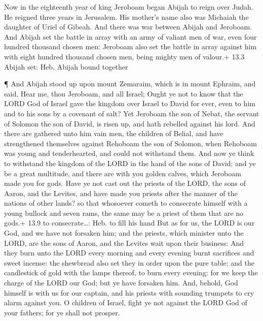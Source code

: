  Now in the eighteenth year of king Jeroboam began Abijah to
reign over Judah.  He reigned three years in Jerusalem. His
mother's name also was Michaiah the daughter of Uriel of Gibeah. And
there was war between Abijah and Jeroboam.  And Abijah set
the battle in array with an army of valiant men of war, even four
hundred thousand chosen men: Jeroboam also set the battle in array
against him with eight hundred thousand chosen men, being mighty men of
valour.+ 13.3 Abijah set: Heb. Abijah bound together

 ¶ And Abijah stood up upon mount Zemaraim, which is in
mount Ephraim, and said, Hear me, thou Jeroboam, and all Israel;
 Ought ye not to know that the LORD God of Israel gave the
kingdom over Israel to David for ever, even to him and to his sons by a
covenant of salt?  Yet Jeroboam the son of Nebat, the
servant of Solomon the son of David, is risen up, and hath rebelled
against his lord.  And there are gathered unto him vain men,
the children of Belial, and have strengthened themselves against
Rehoboam the son of Solomon, when Rehoboam was young and tenderhearted,
and could not withstand them.  And now ye think to withstand
the kingdom of the LORD in the hand of the sons of David; and ye be a
great multitude, and there are with you golden calves, which Jeroboam
made you for gods.  Have ye not cast out the priests of the
LORD, the sons of Aaron, and the Levites, and have made you priests
after the manner of the nations of other lands? so that whosoever cometh
to consecrate himself with a young bullock and seven rams, the same may
be a priest of them that are no gods.+ 13.9 to consecrate\ldots: Heb. to
fill his hand  But as for us, the LORD is our God, and we
have not forsaken him; and the priests, which minister unto the LORD,
are the sons of Aaron, and the Levites wait upon their business:
 And they burn unto the LORD every morning and every
evening burnt sacrifices and sweet incense: the shewbread also set they
in order upon the pure table; and the candlestick of gold with the lamps
thereof, to burn every evening: for we keep the charge of the LORD our
God; but ye have forsaken him.  And, behold, God himself is
with us for our captain, and his priests with sounding trumpets to cry
alarm against you. O children of Israel, fight ye not against the LORD
God of your fathers; for ye shall not prosper.

